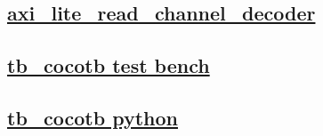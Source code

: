 \documentclass{article}
\begin{document}
  


  \subsection{\href{../files/axi_lite_read_channel_decoder-v.html}{axi\_lite\_read\_channel\_decoder}}
  \subsection{\href{../files2/tb_cocotb-v.html}{tb\_cocotb test bench}}
  \subsection{\href{../files2/tb_cocotb-py.html}{tb\_cocotb python}}
\end{document}
